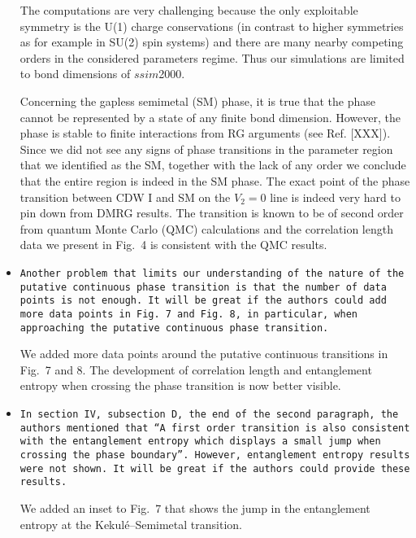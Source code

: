 \documentclass[aps,prb,superscriptaddress]{revtex4}
\begin{document}
\begin{itemize}
The computations are very challenging because the only exploitable symmetry is the U(1) charge conservations (in contrast to higher symmetries as for example in SU(2) spin systems) and there are many nearby competing orders in the considered parameters regime. Thus our simulations are limited to bond dimensions of $ssim$2000.  

Concerning the gapless semimetal (SM) phase, it is true that the phase cannot be represented by a state of any finite bond dimension. However, the phase is stable to finite interactions from RG arguments (see Ref. [XXX]). Since we did not see any signs of phase transitions in the parameter region that we identified as the SM, together with the lack of any order we conclude that the entire region is indeed in the SM phase. The exact point of the phase transition between CDW I and SM on the $V_2=0$ line is indeed very hard to pin down from DMRG results. The transition is known to be of second order from quantum Monte Carlo (QMC) calculations and the correlation length data we present in Fig.~4 is consistent with the QMC results.


\item{\tt Another problem that limits our understanding of the nature of the
putative continuous phase transition is that the number of data points
is not enough. It will be great if the authors could add more data
points in Fig. 7 and Fig. 8, in particular, when approaching the
putative continuous phase transition.}

We added more data points around the putative continuous transitions in Fig.~7 and 8. The development of correlation length and entanglement entropy when crossing the phase transition is now better visible. 

\item{\tt In section IV, subsection D, the end of the second paragraph, the
authors mentioned that “A first order transition is also consistent
with the entanglement entropy which displays a small jump when
crossing the phase boundary”. However, entanglement entropy results
were not shown. It will be great if the authors could provide these
results.}

We added an inset to Fig.~7 that shows the jump in the entanglement entropy at the Kekul\'e--Semimetal transition.




\end{itemize}
\end{document}
